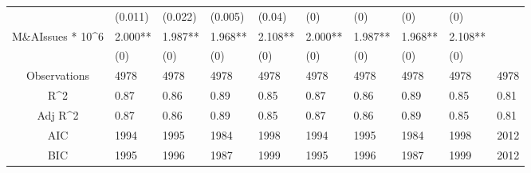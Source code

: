 \documentclass{article}
\begin{document}
\begin{table}[H]
\begin{tabular}{|clllllllll|}
   & (0.011) & (0.022) & (0.005) & (0.04) & (0) & (0) & (0) & (0) &  \\ 
  M\&AIssues * 10^6 & 2.000** & 1.987** & 1.968** & 2.108** & 2.000** & 1.987** & 1.968** & 2.108** &  \\ 
   & (0) & (0) & (0) & (0) & (0) & (0) & (0) & (0) &  \\ 
  \hline 
 Observations & 4978 & 4978 & 4978 & 4978 & 4978 & 4978 & 4978 & 4978 & 4978 \\ 
  R^2 & 0.87 & 0.86 & 0.89 & 0.85 & 0.87 & 0.86 & 0.89 & 0.85 & 0.81 \\ 
  Adj R^2 & 0.87 & 0.86 & 0.89 & 0.85 & 0.87 & 0.86 & 0.89 & 0.85 & 0.81 \\ 
  AIC & 1994 & 1995 & 1984 & 1998 & 1994 & 1995 & 1984 & 1998 & 2012 \\ 
  BIC & 1995 & 1996 & 1987 & 1999 & 1995 & 1996 & 1987 & 1999 & 2012 \\ 
   \hline
\end{tabular}
 
\end{table}
\end{document}
